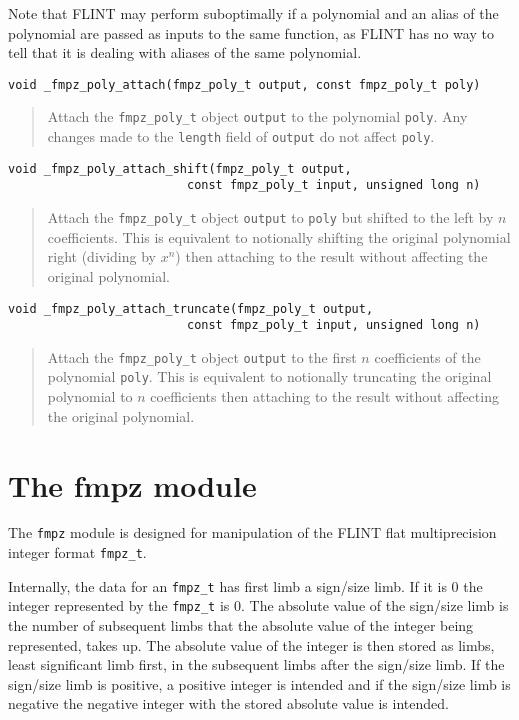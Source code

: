 \documentclass[a4paper,10pt]{article}
\newcommand{\code}{\lstinline}
\begin{document}
Note that FLINT may perform suboptimally if a polynomial and an alias of the polynomial are passed as inputs to the same function, as FLINT has no way to tell that it is dealing with aliases of the same polynomial.

\begin{lstlisting}
void _fmpz_poly_attach(fmpz_poly_t output, const fmpz_poly_t poly)
\end{lstlisting}
\begin{quote}
Attach the \code{fmpz_poly_t} object \code{output} to the polynomial \code{poly}. Any changes made to the \code{length} field of \code{output} do not affect \code{poly}.
\end{quote}

\begin{lstlisting}
void _fmpz_poly_attach_shift(fmpz_poly_t output, 
                         const fmpz_poly_t input, unsigned long n)
\end{lstlisting}
\begin{quote}
Attach the \code{fmpz_poly_t} object \code{output} to \code{poly} but shifted to the left by $n$ coefficients. This is equivalent to notionally shifting the original polynomial right (dividing by $x^n$) then attaching to the result without affecting the original polynomial.
\end{quote}

\begin{lstlisting}
void _fmpz_poly_attach_truncate(fmpz_poly_t output, 
                         const fmpz_poly_t input, unsigned long n)
\end{lstlisting}
\begin{quote}
Attach the \code{fmpz_poly_t} object \code{output} to the first $n$ coefficients of the polynomial \code{poly}. This is equivalent to notionally truncating the original polynomial to $n$ coefficients then attaching to the result without affecting the original polynomial.
\end{quote}

\section{The fmpz module}
The \code{fmpz} module is designed for manipulation of the FLINT flat multiprecision integer format \code{fmpz_t}. 

Internally, the data for an \code{fmpz_t} has first limb a sign/size limb. If it is 0 the integer represented by the \code{fmpz_t} is 0. The absolute value of the sign/size limb is the number of subsequent limbs that the absolute value of the integer being represented, takes up. The absolute value of the integer is then stored as limbs, least significant limb first, in the subsequent limbs after the sign/size limb. If the sign/size limb is positive, a positive integer is intended and if the sign/size limb is negative the negative integer with the stored absolute value is intended.
\end{document}

